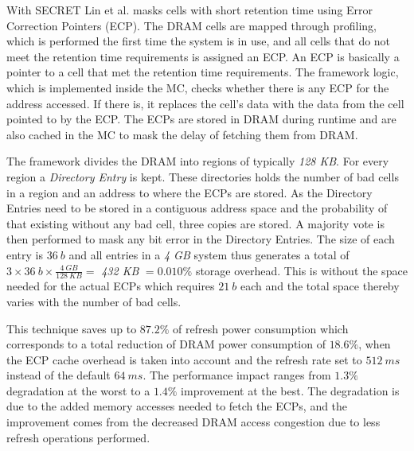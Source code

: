 With SECRET Lin et al. \cite{secret} masks cells with short retention time using Error Correction Pointers (ECP). The DRAM cells are mapped through profiling, which is performed the first time the system is in use, and all cells that do not meet the retention time requirements is assigned an ECP. An ECP is basically a pointer to a cell that met the retention time requirements. The framework logic, which is implemented inside the MC, checks whether there is any ECP for the address accessed. If there is, it replaces the cell's data with the data from the cell pointed to by the ECP. The ECPs are stored in DRAM during runtime and are also cached in the MC to mask the delay of fetching them from DRAM.

The framework divides the DRAM into regions of typically \textit{128 KB}. For every region a \textit{Directory Entry} is kept. These directories holds the number of bad cells in a region and an address to where the ECPs are stored. As the Directory Entries need to be stored in a contiguous address space and the probability of that existing without any bad cell, three copies are stored. A majority vote is then performed to mask any bit error in the Directory Entries. The size of each entry is $36\:b$ and all entries in a \textit{4 GB} system thus generates a total of $3 \times 36\:b \times \frac{4\:GB}{128\:KB} =$ \textit{432 KB} $= 0.010\%$ storage overhead. This is without the space needed for the actual ECPs which requires $21\:b$ each and the total space thereby varies with the number of bad cells. 

This technique saves up to $87.2\%$ of refresh power consumption which corresponds to a total reduction of DRAM power consumption of $18.6\%$, when the ECP cache overhead is taken into account and the refresh rate set to $512\:ms$ instead of the default $64\:ms$. The performance impact ranges from $1.3\%$ degradation at the worst to a $1.4\%$ improvement at the best. The degradation is due to the added memory accesses needed to fetch the ECPs, and the  improvement comes from the decreased DRAM access congestion due to less refresh operations performed.